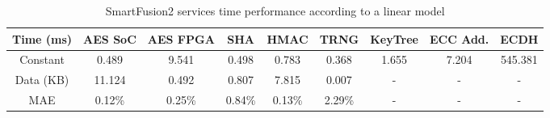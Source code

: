 \begin{table}[h!]
\centering
\def\arraystretch{1.5}
\begin{tabular}{|c|c|c|c|c|c|c|c|c|}
\hline
Time (ms) & AES SoC & AES FPGA & SHA    & HMAC   & TRNG   & KeyTree & ECC Add. & ECDH	\\ \hline
Constant  & 0.489   & 9.541   & 0.498  & 0.783  & 0.368  & 1.655   & 7.204    & 545.381	\\ \hline
Data (KB) & 11.124  & 0.492  & 0.807  & 7.815  & 0.007  & -       & -	   & -		\\ \hline
MAE       & 0.12\%  & 0.25\%  & 0.84\% & 0.13\% & 2.29\% & -       & -	   & -		\\ \hline
\end{tabular}
\caption{SmartFusion2 services time performance according to a linear model}
\label{tab:core-model}
\end{table}

